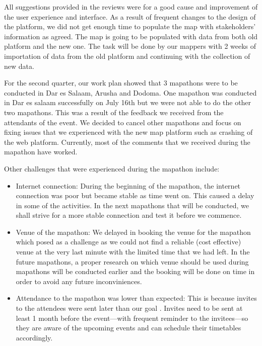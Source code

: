\documentclass[a4paper,12pt,twoside]{article}
\begin{document}
All suggestions provided in the reviews were for a good cause and improvement of the user experience and interface. As a result of frequent changes to the design of the platform, we did not get enough time to populate the map with stakeholders’ information as agreed. The map is going to be populated with data from both old platform and the new one. The task will be done by our mappers with 2 weeks of importation of data from the old platform and continuing with the collection of new data.

\textbf{\color{OMDTZblue}{Mapathon}}

For the second quarter, our work plan showed that 3 mapathons were to be conducted in Dar es Salaam, Arusha and Dodoma. One mapathon was conducted in Dar es salaam successfully on July 16th but we were not able to do the other two mapathons. This was a result of the feedback we received from the attendants of the event. We decided to cancel other mapathons and focus on fixing issues that we experienced with the new map platform such as crashing of the web platform. Currently, most of the comments that we received during the mapathon have worked.

Other challenges that were experienced during the mapathon include:
\begin{itemize}
    \item {\color{OMDTZblue}Internet connection:} During the beginning of the mapathon, the internet connection was poor but became stable as time went on. This caused a delay in some of the activities. In the next mapathons that will be conducted, we shall strive for a more stable connection and test it before we commence.
    
    \item {\color{OMDTZblue}Venue of the mapathon:} We delayed in booking the venue for the mapathon which posed as a challenge as we could not find a reliable (cost effective) venue at the very last minute with the limited time that we had left. In the future mapathons, a proper research on which venue should be used during mapathons will be conducted earlier and the booking will be done on time in order to avoid any future inconviniences.
    
    \item {\color{OMDTZblue}Attendance to the mapathon was lower than expected:} This is because invites to the attendees were sent later than our goal . Invites need to be sent at least 1 month before the event---with frequent reminder to the invitees---so they are aware of the upcoming events and can schedule their timetables accordingly.
\end{itemize}
\end{document}
